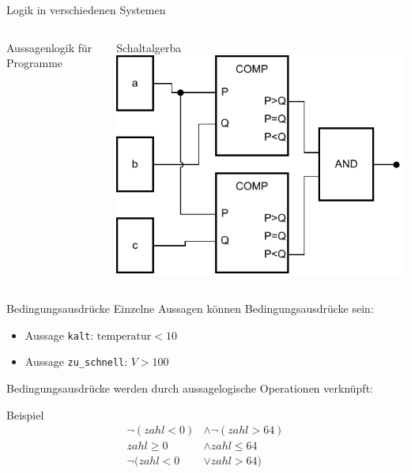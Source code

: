 \documentclass[xelatex,aspectratio=169]{beamer}
\begin{document}
\begin{frame}{Logik in verschiedenen Systemen}
  \vspace{-1em}
  \begin{columns}
    \begin{column}{0.5\textwidth}
      \begin{block}{Aussagenlogik für Programme}
        \inputminted[firstline=5,lastline=8]{python}{src/logik_example.py}
      \end{block}
    \end{column}
    \begin{column}{0.5\textwidth}
      \begin{block}{Schaltalgerba}
        \includegraphics[width=\textwidth]{fig/logik_schaltalgebra.pdf}
      \end{block}
    \end{column}
  \end{columns}
  \vspace{1em}
\end{frame}

\begin{frame}{Bedingungsausdrücke}
  Einzelne Aussagen können Bedingungsausdrücke sein:
  \begin{itemize}
    \item[~] Aussage \texttt{kalt}: \(\mbox{temperatur} < 10\)
    \item[~] Aussage \texttt{zu\_schnell}: \(V > 100\)
  \end{itemize}

  Bedingungsausdrücke werden durch aussagelogische Operationen verknüpft:

  \begin{exampleblock}{Beispiel}
    \begin{align*}
      \lnot \left( zahl < 0 \right) & \land \lnot (zahl > 64) \\
      zahl \geq 0                   & \land zahl \leq 64      \\
      \lnot ( zahl < 0              & \lor zahl > 64 )
    \end{align*}
  \end{exampleblock}

\end{frame}

\end{document}
